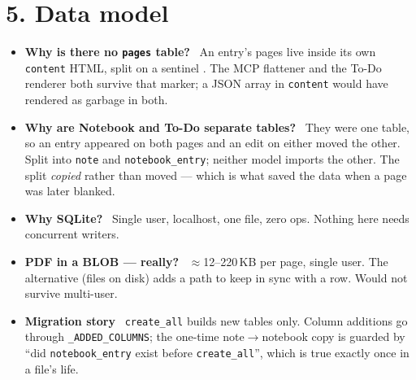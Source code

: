 \documentclass[10pt]{article}
\newcommand{\qa}[2]{\item \textbf{#1} \, #2}
\newcommand{\code}[1]{\texttt{\small #1}}
\begin{document}
\section*{5. Data model}

\begin{center}
\end{center}

\begin{itemize}
\qa{Why is there no \code{pages} table?}{An entry's pages live inside its own \code{content} HTML, split on a sentinel \code{<hr data-page-break>}. The MCP flattener and the To-Do renderer both survive that marker; a JSON array in \code{content} would have rendered as garbage in both.}
\qa{Why are Notebook and To-Do separate tables?}{They were one table, so an entry appeared on both pages and an edit on either moved the other. Split into \code{note} and \code{notebook\_entry}; neither model imports the other. The split \emph{copied} rather than moved --- which is what saved the data when a page was later blanked.}
\qa{Why SQLite?}{Single user, localhost, one file, zero ops. Nothing here needs concurrent writers.}
\qa{PDF in a BLOB --- really?}{$\approx$12--220\,KB per page, single user. The alternative (files on disk) adds a path to keep in sync with a row. Would not survive multi-user.}
\qa{Migration story}{\code{create\_all} builds new tables only. Column additions go through \code{\_ADDED\_COLUMNS}; the one-time note$\to$notebook copy is guarded by ``did \code{notebook\_entry} exist before \code{create\_all}'', which is true exactly once in a file's life.}
\end{itemize}
\end{document}
